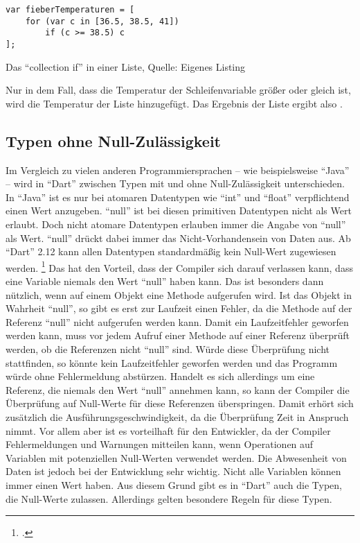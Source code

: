 \ifIncludeFigures
  \begin{listing}[ht]
    \begin{verbatim}
var fieberTemperaturen = [
    for (var c in [36.5, 38.5, 41])
        if (c >= 38.5) c
];
\end{verbatim}
    \caption[\enquote{Collection if} in einer Liste]{Das \enquote{collection if} in einer Liste, Quelle: Eigenes Listing}
    \label{lst:CollectionIfInEinerListe}
  \end{listing}
\fi

Nur in dem Fall, dass die Temperatur der Schleifenvariable  größer oder gleich  ist, wird die Temperatur der Liste hinzugefügt.
Das Ergebnis der Liste  ergibt also \IC{[38.5, 41]}.


\subsection{Typen ohne Null-Zulässigkeit} Im Vergleich zu vielen anderen Programmiersprachen -- wie beispielsweise \enquote{Java} -- wird in \enquote{Dart} zwischen Typen mit und ohne Null-Zulässigkeit unterschieden.
In \enquote{Java} ist es nur bei atomaren Datentypen wie \enquote{int} und \enquote{float} verpflichtend einen Wert anzugeben.
\enquote{null} ist bei diesen primitiven Datentypen nicht als Wert erlaubt.
Doch nicht atomare Datentypen erlauben immer die Angabe von \enquote{null} als Wert.
\enquote{null} drückt dabei immer das Nicht-Vorhandensein von Daten aus.
Ab \enquote{Dart} 2.12   kann allen Datentypen standardmäßig kein Null-Wert zugewiesen werden. \footcite[Vgl.][]{AnnouncingDartTwoDotTwelve}
Das hat den Vorteil, dass der Compiler sich darauf verlassen kann, 
dass eine Variable niemals den Wert \enquote{null} haben kann. 
Das ist besonders dann nützlich, 
wenn auf einem Objekt eine Methode aufgerufen wird. 
Ist das Objekt in Wahrheit \enquote{null}, 
so gibt es erst zur Laufzeit einen Fehler, 
da die Methode auf der Referenz \enquote{null} nicht aufgerufen werden kann. 
Damit ein Laufzeitfehler geworfen werden kann, 
muss vor jedem Aufruf einer Methode auf einer Referenz überprüft werden, ob die Referenzen nicht \enquote{null} sind. 
Würde diese Überprüfung nicht stattfinden, 
so könnte kein Laufzeitfehler geworfen werden und das Programm würde ohne Fehlermeldung abstürzen. 
Handelt es sich allerdings um eine Referenz, 
die niemals den Wert \enquote{null} annehmen kann, 
so kann der Compiler die Überprüfung auf Null-Werte für diese Referenzen überspringen. 
Damit erhört sich zusätzlich die Ausführungsgeschwindigkeit, 
da die Überprüfung Zeit in Anspruch nimmt. 
Vor allem aber ist es vorteilhaft für den Entwickler, 
da der Compiler  Fehlermeldungen und Warnungen mitteilen kann, 
wenn Operationen auf Variablen mit potenziellen Null-Werten verwendet werden. 
Die Abwesenheit von Daten ist jedoch bei der Entwicklung sehr wichtig. 
Nicht alle Variablen können immer einen Wert haben. 
Aus diesem Grund gibt es in \enquote{Dart} auch die Typen, 
die Null-Werte zulassen.
Allerdings gelten besondere Regeln für diese Typen.

